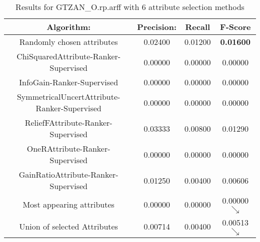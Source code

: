 \begin{table}[p]
\begin{center}
\begin{tabular}{|c|c|c|c|}
\hline Algorithm: & Precision: & Recall & F-Score\\
\hline Randomly chosen attributes & 0.02400 & 0.01200 & {\bf 0.01600}\\
\hline ChiSquaredAttribute-Ranker-Supervised & 0.00000 & 0.00000 & 0.00000\\
\hline InfoGain-Ranker-Supervised & 0.00000 & 0.00000 & 0.00000\\
\hline SymmetricalUncertAttribute-Ranker-Supervised & 0.00000 & 0.00000 &
0.00000\\
\hline ReliefFAttribute-Ranker-Supervised & 0.03333 & 0.00800 & 0.01290\\
\hline OneRAttribute-Ranker-Supervised & 0.00000 & 0.00000 & 0.00000\\
\hline GainRatioAttribute-Ranker-Supervised & 0.01250 & 0.00400 & 0.00606
\\
\hline Most appearing attributes & 0.00000 & 0.00000 & 0.00000 $\searrow$\\
\hline Union of selected Attributes & 0.00714 & 0.00400 & 0.00513 $\searrow$\\

\hline
\end{tabular}
\caption{Results for GTZAN\_O.rp.arff with 6 attribute selection methods}
\label{table:classifier:GTZANO6}
\end{center}
\end{table}



